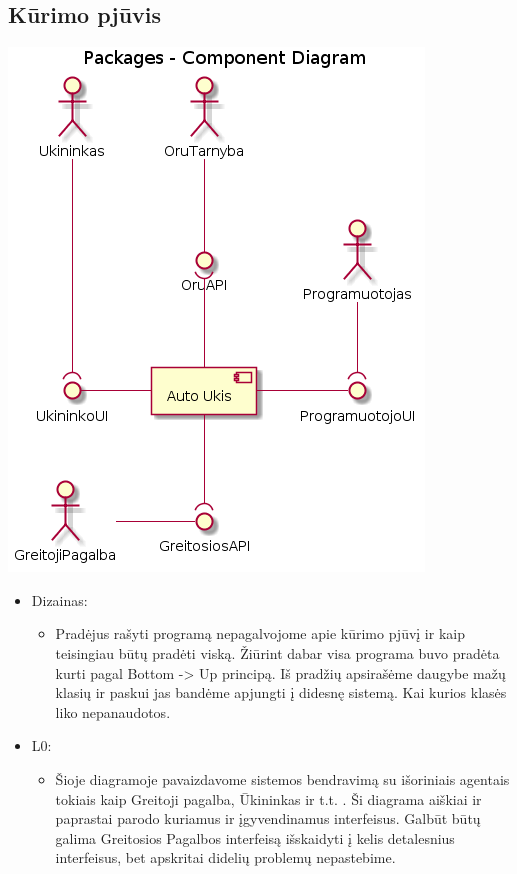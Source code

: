 \documentclass[oneside]{VUMIFPSkursinis}
\begin{document}
\subsection{Kūrimo pjūvis}
\includegraphics{l0.png}	
	\pagebreak
	\begin{itemize}
		\item Dizainas: 
		\begin{itemize}
			\item Pradėjus rašyti programą nepagalvojome apie kūrimo pjūvį ir kaip teisingiau būtų pradėti viską. Žiūrint dabar visa programa buvo pradėta kurti pagal Bottom -> Up principą. Iš pradžių apsirašėme daugybe mažų klasių ir paskui jas bandėme apjungti į didesnę sistemą. Kai kurios klasės liko nepanaudotos. 
		\end{itemize}
		\item L0:
		\begin{itemize}
			\item Šioje diagramoje pavaizdavome sistemos bendravimą su išoriniais agentais tokiais kaip Greitoji pagalba, Ūkininkas ir t.t. . Ši diagrama aiškiai ir paprastai parodo kuriamus ir įgyvendinamus interfeisus. Galbūt būtų galima Greitosios Pagalbos interfeisą išskaidyti į kelis detalesnius interfeisus, bet apskritai didelių problemų nepastebime.

		\end{itemize}
	\end{itemize}
\end{document}
